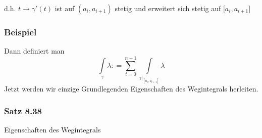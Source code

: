 \begin{enumerate}
\noindent d.h. $t\rightarrow\gamma'(t)$ ist auf $\left( a_i, a_{i+1}\right)$ stetig und erweitert sich stetig auf $\lbrack a_i, a_{i+1}\rbrack$
\subsubsection*{Beispiel}
Dann definiert man
\[\int\limits_\gamma  \lambda  : = \sum\limits_{t = 0}^{n - 1} {\int\limits_{{{\left. \gamma  \right|}_{\left[ {{a_i},{a_{i + 1}}} \right]}}} \lambda  } \]
Jetzt werden wir einzige Grundlegenden Eigenschaften des Wegintegrals herleiten. 
\end{enumerate}

\subsubsection*{Satz 8.38}
Eigenschaften des Wegintegrals
